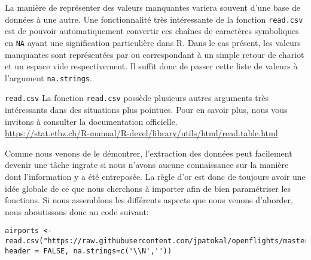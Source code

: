 La manière de représenter des valeurs manquantes variera souvent d'une base de données à une autre. Une fonctionnalité très intéressante de la fonction \texttt{read.csv} est de pouvoir automatiquement convertir ces chaînes de caractères symboliques en \texttt{NA} ayant une signification particulière dans R. Dans le cas présent, les valeurs manquantes sont représentées par  ou  correspondant à un simple retour de chariot et un espace vide respectivement. Il suffit donc de passer cette liste de valeurs à l'argument \texttt{na.strings}. \\

\begin{moreInfo}{\texttt{read.csv}}
	La fonction \texttt{read.csv} possède plusieurs autres arguments très intéressants dans des situations plus pointues. Pour en savoir plus, nous vous invitons à consulter la documentation officielle. \\
	\url{https://stat.ethz.ch/R-manual/R-devel/library/utils/html/read.table.html}
\end{moreInfo}

Comme nous venons de le démontrer, l'extraction des données peut facilement devenir une tâche ingrate si nous n'avons aucune connaissance sur la manière dont l'information y a été entreposée. La règle d'or est donc de toujours avoir une idée globale de ce que nous cherchons à importer afin de bien paramétriser les fonctions. Si nous assemblons les différents aspects que nous venons d'aborder, nous aboutissons donc au code suivant:
\begin{lstlisting}[caption = Extraction des données,label=src:Extraction]
	airports <- read.csv("https://raw.githubusercontent.com/jpatokal/openflights/master/data/airports.dat", header = FALSE, na.strings=c('\\N',''))
\end{lstlisting}